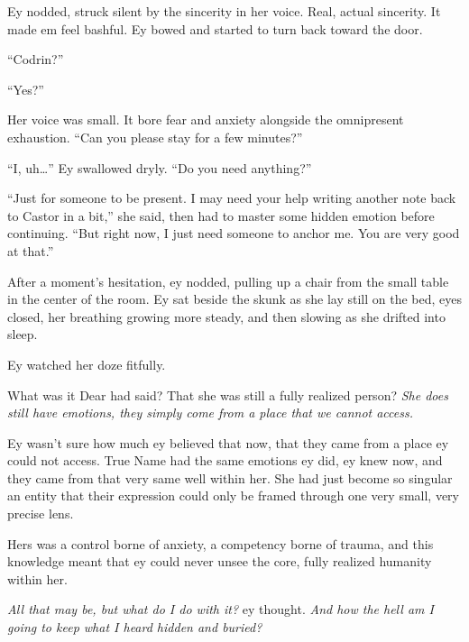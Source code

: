 Ey nodded, struck silent by the sincerity in her voice. Real, actual sincerity. It made em feel bashful. Ey bowed and started to turn back toward the door.

``Codrin?''

``Yes?''

Her voice was small. It bore fear and anxiety alongside the omnipresent exhaustion. ``Can you please stay for a few minutes?''

``I, uh\ldots{}'' Ey swallowed dryly. ``Do you need anything?''

``Just for someone to be present. I may need your help writing another note back to Castor in a bit,'' she said, then had to master some hidden emotion before continuing. ``But right now, I just need someone to anchor me. You are very good at that.''

After a moment's hesitation, ey nodded, pulling up a chair from the small table in the center of the room. Ey sat beside the skunk as she lay still on the bed, eyes closed, her breathing growing more steady, and then slowing as she drifted into sleep.

Ey watched her doze fitfully.

What was it Dear had said? That she was still a fully realized person? \emph{She does still have emotions, they simply come from a place that we cannot access.}

Ey wasn't sure how much ey believed that now, that they came from a place ey could not access. True Name had the same emotions ey did, ey knew now, and they came from that very same well within her. She had just become so singular an entity that their expression could only be framed through one very small, very precise lens.

Hers was a control borne of anxiety, a competency borne of trauma, and this knowledge meant that ey could never unsee the core, fully realized humanity within her.

\emph{All that may be, but what do I do with it?} ey thought. \emph{And how the hell am I going to keep what I heard hidden and buried?}
